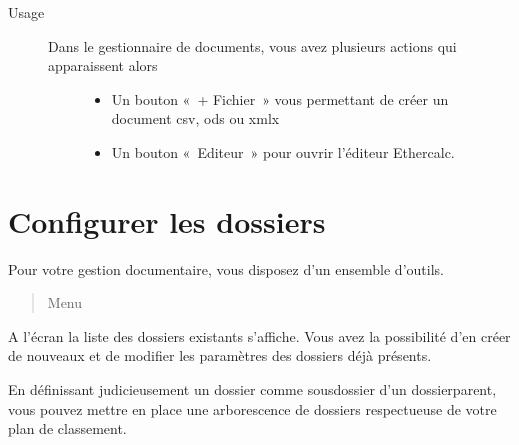 \documentclass[a4paper,10pt,oneside,french]{sphinxmanual}
\begin{document}
\begin{sphinxVerbatim}[commandchars=\\\{\}]
   
\end{sphinxVerbatim}
\begin{description}
\item[{Usage}] \leavevmode\begin{description}
\item[{Dans le gestionnaire de documents, vous avez plusieurs actions qui apparaissent alors}] \leavevmode\begin{itemize}
\item {} 
Un bouton « + Fichier » vous permettant de créer un document csv, ods ou xmlx

\item {} 
Un bouton « Editeur » pour ouvrir l’éditeur Ethercalc.

\end{itemize}

\end{description}

\end{description}

\noindent{}


\section{Configurer les dossiers}
\label{\detokenize{documents/configuration:configurer-les-dossiers}}\label{\detokenize{documents/configuration::doc}}
Pour votre gestion documentaire, vous disposez d’un ensemble d’outils.
\begin{quote}

Menu 
\end{quote}

A l’écran la liste des dossiers existants s’affiche. Vous avez la possibilité d’en créer de nouveaux et de modifier les paramètres des dossiers déjà présents.

\noindent{}

En définissant judicieusement un dossier comme sous\sphinxhyphen{}dossier d’un dossier\sphinxhyphen{}parent, vous pouvez  mettre en place une arborescence de dossiers respectueuse de votre plan de classement.
\end{document}

